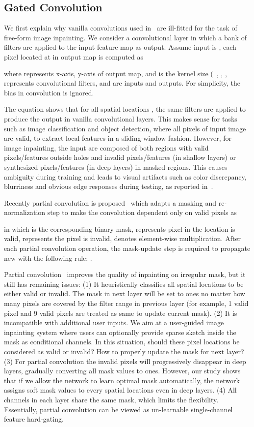 \documentclass[10pt,twocolumn,letterpaper]{article}
\begin{document}
\subsection{Gated Convolution}
We first explain why vanilla convolutions used in~\cite{iizuka2017globally,yu2018generative} are ill-fitted for the task of free-form image inpainting. We consider a convolutional layer in which a bank of filters are applied to the input feature map as output. Assume input is , each pixel located at  in  output map is computed as 

where  represents x-axis, y-axis of output map,  and  is the kernel size (\eg~, , ,  represents convolutional filters,  and  are inputs and outputs. For simplicity, the bias in convolution is ignored.

The equation shows that for all spatial locations , the same filters are applied to produce the output in vanilla convolutional layers. This makes sense for tasks such as image classification and object detection, where all pixels of input image are valid, to extract local features in a sliding-window fashion. However, for image inpainting, the input are composed of both regions with valid pixels/features outside holes and invalid pixels/features (in shallow layers) or synthesized pixels/features (in deep layers) in masked regions. This causes ambiguity during training and leads to visual artifacts such as color discrepancy, blurriness and obvious edge responses during testing, as reported in~\cite{liu2018image}.

Recently partial convolution is proposed~\cite{liu2018image} which adapts a masking and re-normalization step to make the convolution dependent only on valid pixels as

in which  is the corresponding binary mask,  represents pixel in the location  is valid,  represents the pixel is invalid,  denotes element-wise multiplication. After each partial convolution operation, the mask-update step is required to propagate new  with the following rule: .

Partial convolution~\cite{liu2018image} improves the quality of inpainting on irregular mask, but it still has remaining issues: (1) It heuristically classifies all spatial locations to be either valid or invalid. The mask in next layer will be set to ones no matter how many pixels are covered by the filter range in previous layer (for example, 1 valid pixel and 9 valid pixels are treated as same to update current mask). (2) It is incompatible with additional user inputs. We aim at a user-guided image inpainting system where users can optionally provide sparse sketch inside the mask as conditional channels. In this situation, should these pixel locations be considered as valid or invalid? How to properly update the mask for next layer? (3) For partial convolution the invalid pixels will progressively disappear in deep layers, gradually converting all mask values to ones. However, our study shows that if we allow the network to learn optimal mask automatically, the network assigns soft mask values to every spatial locations even in deep layers. (4) All channels in each layer share the same mask, which limits the flexibility. Essentially, partial convolution can be viewed as un-learnable single-channel feature hard-gating.
\end{document}
